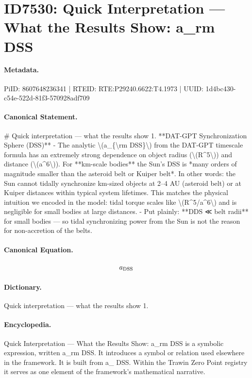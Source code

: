 \section*{ID7530: Quick Interpretation — What the Results Show: a\_rm DSS}
\paragraph{Metadata.}
PiID: 8607648236341 | RTEID: RTE:P29240.6622:T4.1973 | UUID: 1d4bc430-c54e-522d-81f3-570928adf709

\paragraph{Canonical Statement.}
\# Quick interpretation — what the results show 1. **DAT-GPT Synchronization Sphere (DSS)** - The analytic \textbackslash{}(a\_\{\textbackslash{}rm DSS\}\textbackslash{}) from the DAT-GPT timescale formula has an extremely strong dependence on object radius (\textbackslash{}(R\textasciicircum{}5\textbackslash{})) and distance (\textbackslash{}(a\textasciicircum{}6\textbackslash{})). For **km-scale bodies** the Sun’s DSS is *many orders of magnitude smaller than the asteroid belt or Kuiper belt*. In other words: the Sun cannot tidally synchronize km-sized objects at 2–4 AU (asteroid belt) or at Kuiper distances within typical system lifetimes. This matches the physical intuition we encoded in the model: tidal torque scales like \textbackslash{}(R\textasciicircum{}5/a\textasciicircum{}6\textbackslash{}) and is negligible for small bodies at large distances. - Put plainly: **DDS ≪ belt radii** for small bodies — so tidal synchronizing power from the Sun is not the reason for non-accretion of the belts.

\paragraph{Canonical Equation.}
\[
a_{\rm DSS}
\]

\paragraph{Dictionary.}
Quick interpretation — what the results show 1.

\paragraph{Encyclopedia.}
Quick Interpretation — What the Results Show: a\_rm DSS is a symbolic expression, written a\_rm DSS. It introduces a symbol or relation used elsewhere in the framework. It is built from a\_ DSS. Within the Trawin Zero Point registry it serves as one element of the framework's mathematical narrative.
